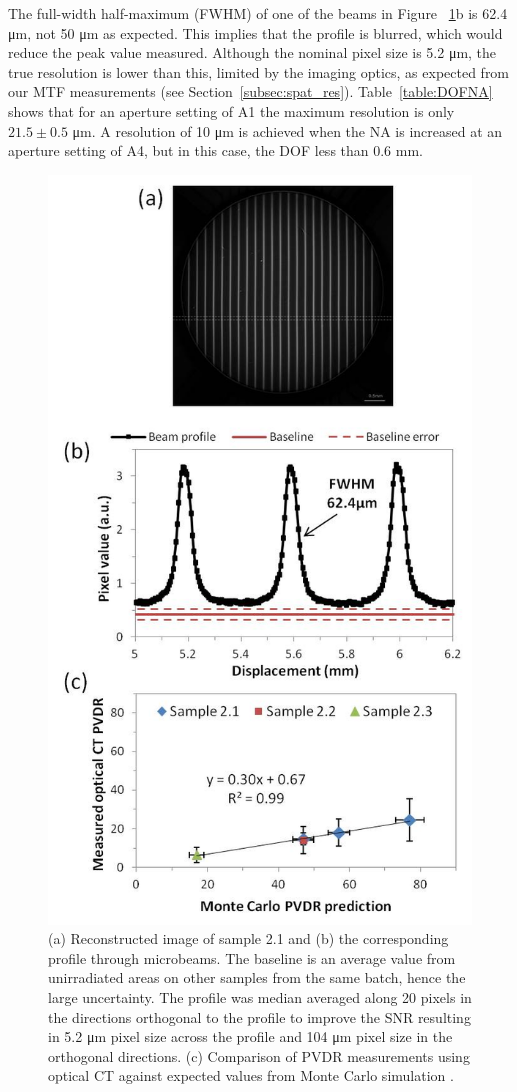	The full-width half-maximum (FWHM) of one of the beams in Figure ~\ref{fig:Fig7}b is 62.4 \si{\um}, not 50 \si{\um} as expected. This implies that the profile is blurred, which would reduce the peak value measured. Although the nominal pixel size is 5.2 \si{\um}, the true resolution is lower than this, limited by the imaging optics, as expected from our MTF measurements (see Section~\ref{subsec:spat_res}). 
	Table~\ref{table:DOFNA} shows that for an aperture setting of A1  the maximum resolution is only $21.5 \pm 0.5$ \si{\um}. A resolution of 10 \si{\um} is achieved when the NA is increased at an aperture setting of A4, but in this case, the DOF less than 0.6 mm.
	
	\begin{figure}
		\centering
		\includegraphics[width=0.75\linewidth]{mrt_img/mrt_Fig7}
		\caption{(a) Reconstructed image of sample 2.1 and (b) the corresponding profile through microbeams. The baseline is an average value from unirradiated areas on other samples from the same batch, hence the large uncertainty. The profile was median averaged along 20 pixels in the directions orthogonal to the profile to improve the SNR resulting in 5.2 \si{\um} pixel size across the profile and 104 \si{\um} pixel size in the orthogonal directions. (c) Comparison of PVDR measurements using optical CT against expected values from Monte Carlo simulation \cite{martinez-roviradevelopment2012}.}
		\label{fig:Fig7}
	\end{figure}
	
